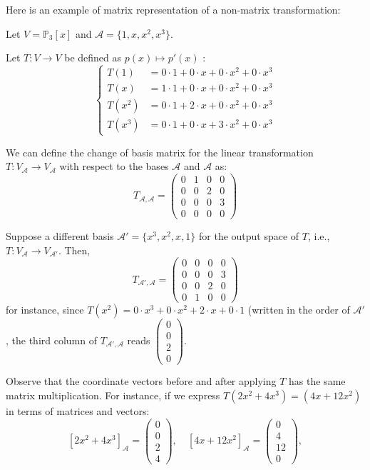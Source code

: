Here is an example of matrix representation of a non-matrix transformation:
\begin{example}
Let \( V = \mathbb{P}_3[x] \) and \( \mathcal{A} = \{ 1, x, x^2, x^3 \} \).

Let \( T : V \to V \) be defined as \( p(x) \mapsto p'(x) \) :
\[
\left\{
\begin{aligned}
T(1) &= 0 \cdot 1 + 0 \cdot x + 0 \cdot x^2 + 0 \cdot x^3 \\
T(x) &= 1 \cdot 1 + 0 \cdot x + 0 \cdot x^2 + 0 \cdot x^3 \\
T(x^2) &= 0 \cdot 1 + 2 \cdot x + 0 \cdot x^2 + 0 \cdot x^3 \\
T(x^3) &= 0 \cdot 1 + 0 \cdot x + 3 \cdot x^2 + 0 \cdot x^3
\end{aligned}
\right.
\]

We can define the change of basis matrix for the linear transformation \( T: V_{\mathcal{A}} \to V_{\mathcal{A}} \) with respect to the bases \( \mathcal{A} \) and \( \mathcal{A} \) as:
\[
T_{\mathcal{A},\mathcal{A}} =
\begin{pmatrix}
0 & 1 & 0 & 0 \\
0 & 0 & 2 & 0 \\
0 & 0 & 0 & 3 \\
0 & 0 & 0 & 0
\end{pmatrix}
\]

Suppose a different basis \( \mathcal{A}' = \{ x^3, x^2, x, 1 \} \) for the output space of \( T \), i.e., \( T : V_{\mathcal{A}} \to V_{\mathcal{A}'} \). Then,
\[
T_{\mathcal{A}', \mathcal{A}} =
\begin{pmatrix}
0 & 0 & 0 & 0 \\
0 & 0 & 0 & 3 \\
0 & 0 & 2 & 0 \\
0 & 1 & 0 & 0
\end{pmatrix}
\]
for instance, since $T(x^2) = 0\cdot x^3 + 0\cdot x^2 + 2\cdot x + 0\cdot 1$ (written in the order of $\mathcal{A}'$, the third column of $T_{\mathcal{A}', \mathcal{A}}$ reads $\begin{pmatrix}
    0 \\ 0 \\ 2 \\0 
\end{pmatrix}$.
\end{example}
Observe that the coordinate vectors before and after applying \( T \) has the same matrix multiplication. For instance, if we express $T(2x^2 + 4x^3) = (4x + 12x^2)$ in terms of matrices and vectors:
\[
[2x^2 + 4x^3]_{\mathcal{A}} =
\begin{pmatrix}
0 \\ 0 \\ 2 \\ 4
\end{pmatrix},
\quad
[4x + 12x^2]_{\mathcal{A}} =
\begin{pmatrix}
0 \\ 4 \\ 12 \\ 0
\end{pmatrix},\]
